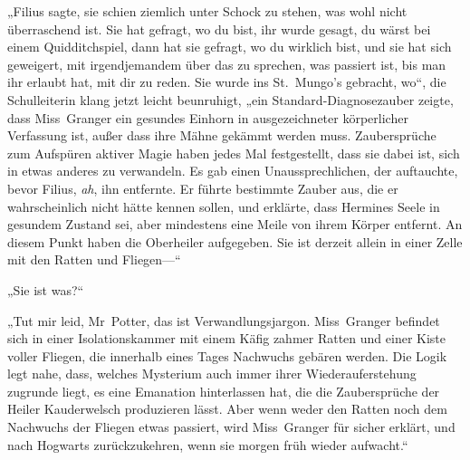 „Filius sagte, sie schien ziemlich unter Schock zu stehen, was wohl nicht überraschend ist. Sie hat gefragt, wo du bist, ihr wurde gesagt, du wärst bei einem Quidditchspiel, dann hat sie gefragt, wo du wirklich bist, und sie hat sich geweigert, mit irgendjemandem über das zu sprechen, was passiert ist, bis man ihr erlaubt hat, mit dir zu reden. Sie wurde ins St.~Mungo’s gebracht, wo“, die Schulleiterin klang jetzt leicht beunruhigt, „ein Standard-Diagnosezauber zeigte, dass Miss~Granger ein gesundes Einhorn in ausgezeichneter körperlicher Verfassung ist, außer dass ihre Mähne gekämmt werden muss. Zaubersprüche zum Aufspüren aktiver Magie haben jedes Mal festgestellt, dass sie dabei ist, sich in etwas anderes zu verwandeln. Es gab einen Unaussprechlichen, der auftauchte, bevor Filius, \emph{ah}, ihn entfernte. Er führte bestimmte Zauber aus, die er wahrscheinlich nicht hätte kennen sollen, und erklärte, dass Hermines Seele in gesundem Zustand sei, aber mindestens eine Meile von ihrem Körper entfernt. An diesem Punkt haben die Oberheiler aufgegeben. Sie ist derzeit allein in einer Zelle mit den Ratten und Fliegen—“

„Sie ist was?“

„Tut mir leid, Mr~Potter, das ist Verwandlungsjargon. Miss~Granger befindet sich in einer Isolationskammer mit einem Käfig zahmer Ratten und einer Kiste voller Fliegen, die innerhalb eines Tages Nachwuchs gebären werden. Die Logik legt nahe, dass, welches Mysterium auch immer ihrer Wiederauferstehung zugrunde liegt, es eine Emanation hinterlassen hat, die die Zaubersprüche der Heiler Kauderwelsch produzieren lässt. Aber wenn weder den Ratten noch dem Nachwuchs der Fliegen etwas passiert, wird Miss~Granger für sicher erklärt, und nach Hogwarts zurückzukehren, wenn sie morgen früh wieder aufwacht.“


